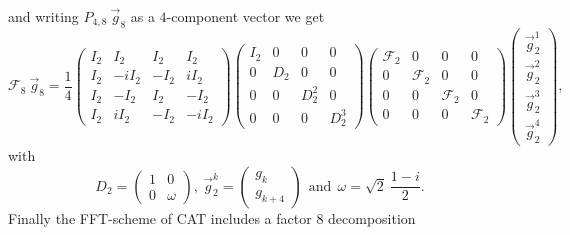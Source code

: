 and writing $P_{4,8} \ \vec{g}_{8}$ as a $4$-component vector we get
\begin{equation} \label{eq_F8ex01}
 \mathcal{F}_{8} \ \vec{g}_{8}
  = 
 \frac{1}{4}
  \left(
   \begin{array}{rrrr}
    I_{2} & I_{2} & I_{2} & I_{2} 
    \\
    I_{2} & -iI_{2} & -I_{2} & iI_{2} 
    \\
    I_{2} & -I_{2} & I_{2} & -I_{2} 
    \\
    I_{2} & iI_{2} & -I_{2} & -iI_{2}
   \end{array}
  \right) 
  \left(
   \begin{array}{cccc}
    I_{2} &  0    &  0        &  0
    \\
      0   & D_{2} &  0        &  0
    \\
      0   &   0   & D^{2}_{2} &  0
    \\
      0   &   0   &   0       & D^{3}_{2}
   \end{array}
  \right)
  \left(
   \begin{array}{cccc}
    \mathcal{F}_{2} &  0  &   0  &  0
    \\
        0   & \mathcal{F}_{2} & 0 & 0
    \\
        0   &   0   & \mathcal{F}_{2} & 0
    \\
        0   &   0     &  0  &  \mathcal{F}_{2}
   \end{array}
  \right)
  \left(
   \begin{array}{c}
    \vec{g}^{1}_{2}
     \\
    \vec{g}^{2}_{2}
     \\
    \vec{g}^{3}_{2}
     \\
    \vec{g}^{4}_{2}
   \end{array}
  \right),
\end{equation}
with
\begin{equation} \label{eq_F8ex02}
 D_{2} 
  = 
 \left(
  \begin{array}{cc}
    1 & 0
    \\
    0 & \omega
  \end{array}
 \right)
 , \ 
 \vec{g}^{k}_{2} 
  =
 \left(
  \begin{array}{c}
   g_{k}
   \\
   g_{k+4}
  \end{array}
 \right)
 \ \ \mbox{and} \ \
 \omega 
  =
 \sqrt{2} \  \frac{1 - i}{2}.
\end{equation}
Finally the FFT-scheme of CAT includes a factor $8$ decomposition
